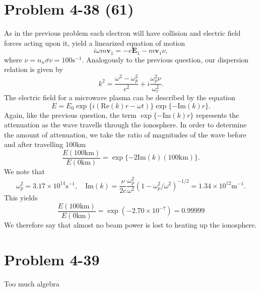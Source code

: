 \section*{Problem 4-38 (61)}
\label{sec:4-38}
As in the previous problem each electron will have collision and electric field forces acting upon it, yield a linearized equation of motion
\begin{equation*}
i\omega m \bm{v}_1 = -e\bm{E}_1 - m \bm{v}_1\nu,
\end{equation*}
where \(\nu = n_n\overline{\sigma v} =100\text{s}^{-1}\). Analogously to the previous question, our dispersion relation is given by
\begin{equation*}
	k^2 = \dfrac{\omega^2 - \omega^2_p}{c^2} + i\dfrac{\omega^2_p\nu}{\omega^2_c}.
\end{equation*}
The electric field for a microwave plasma can be described by the equation
\begin{equation*}
	E = E_0\exp\{i\left(\text{Re}(k)r - \omega t \right) \}\exp\{-\text{Im}(k)r \}.
\end{equation*}
Again, like the previous question, the term \(\exp\{-\text{Im}(k)r \} \) represents the attenuation as the wave travells through the ionosphere. In order to determine the amount of attenuation, we take the ratio of magnitudes of the wave before and after travelling 100km 
\begin{equation*}
	\dfrac{E(100\text{km})}{E(0\text{km})} = \exp\{-2\text{Im}(k)(100\text{km}) \}.
\end{equation*}
We note that 
\begin{equation*}
	\omega^2_p = 3.17\times 10^{14}\text{s}^{-1}, \quad \text{Im}(k) = \dfrac{\nu}{2c}\dfrac{\omega^2_p}{\omega^2}\left(1 - \omega^2_p/\omega^2\right)^{-1/2} = 1.34\times 10^{12}\text{m}^{-1}.
\end{equation*}
This yields 
\begin{equation*}
	\dfrac{E(100\text{km})}{E(0\text{km})} = \exp(-2.70\times 10^{-7}) = 0.99999
\end{equation*}
We therefore say that almost no beam power is lost to heating up the ionosphere. 


\section*{Problem 4-39}
\label{sec:4-39}
Too much algebra

